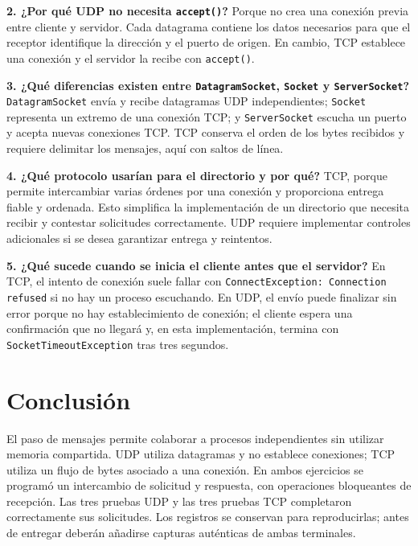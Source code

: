 \documentclass[12pt,oneside]{book}
\begin{document}
\textbf{2. ¿Por qué UDP no necesita \texttt{accept()}?} Porque no crea una conexión previa entre cliente y servidor. Cada datagrama contiene los datos necesarios para que el receptor identifique la dirección y el puerto de origen. En cambio, TCP establece una conexión y el servidor la recibe con \texttt{accept()}.

\textbf{3. ¿Qué diferencias existen entre \texttt{DatagramSocket}, \texttt{Socket} y \texttt{ServerSocket}?} \texttt{DatagramSocket} envía y recibe datagramas UDP independientes; \texttt{Socket} representa un extremo de una conexión TCP; y \texttt{ServerSocket} escucha un puerto y acepta nuevas conexiones TCP. TCP conserva el orden de los bytes recibidos y requiere delimitar los mensajes, aquí con saltos de línea.

\textbf{4. ¿Qué protocolo usarían para el directorio y por qué?} TCP, porque permite intercambiar varias órdenes por una conexión y proporciona entrega fiable y ordenada. Esto simplifica la implementación de un directorio que necesita recibir y contestar solicitudes correctamente. UDP requiere implementar controles adicionales si se desea garantizar entrega y reintentos.

\textbf{5. ¿Qué sucede cuando se inicia el cliente antes que el servidor?} En TCP, el intento de conexión suele fallar con \texttt{ConnectException: Connection refused} si no hay un proceso escuchando. En UDP, el envío puede finalizar sin error porque no hay establecimiento de conexión; el cliente espera una confirmación que no llegará y, en esta implementación, termina con \texttt{SocketTimeoutException} tras tres segundos.

\section{Conclusión}
El paso de mensajes permite colaborar a procesos independientes sin utilizar memoria compartida. UDP utiliza datagramas y no establece conexiones; TCP utiliza un flujo de bytes asociado a una conexión. En ambos ejercicios se programó un intercambio de solicitud y respuesta, con operaciones bloqueantes de recepción. Las tres pruebas UDP y las tres pruebas TCP completaron correctamente sus solicitudes. Los registros se conservan para reproducirlas; antes de entregar deberán añadirse capturas auténticas de ambas terminales.
\end{document}

